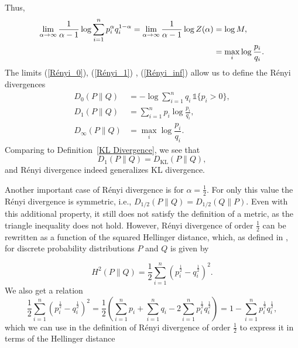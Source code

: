 Thus,
\begin{equation}
	\begin{aligned}
		\lim_{\alpha \rightarrow \infty} \frac{1}{\alpha-1} \log \sum_{i=1}^{n} p_i^\alpha q_i^{1-\alpha} = \lim_{\alpha \rightarrow \infty} \frac{1}{\alpha-1} \log Z(\alpha) &= \log M, \\
		&= \max_{i} \log \frac{p_i}{q_i}.
	\label{Rényi_inf}
	\end{aligned}
\end{equation}
The limits (\ref{Rényi_0}), (\ref{Rényi_1}) , (\ref{Rényi_inf}) allow us to define the Rényi divergences
\begin{equation*}
	\begin{aligned}
		D_0(P \| Q) &= - \log \sum_{i=1}^{n} q_i \, \mathds{1}\{p_i>0\}, \\
		D_1(P \| Q) &= \sum_{i=1}^{n} p_i \log \frac{p_i}{q_i}, \\
		D_\infty(P \| Q) &= \max_{i} \log{\dfrac{p_i}{q_i}}.
	\end{aligned}
\end{equation*}
Comparing to Definition~\ref{KL Divergence}, we see that
\begin{equation*}
	D_1(P \| Q) = D_{\text{KL}}(P \| Q),
\end{equation*}
and Rényi divergence indeed generalizes KL divergence.

Another important case of Rényi divergence is for $\alpha=\frac{1}{2}$. For only this value the Rényi divergence is symmetric, i.e., $D_{1/2}(P \| Q) = D_{1/2}(Q \| P)$. Even with this additional property, it still does not satisfy the definition of a metric, as the triangle inequality does not hold. However, Rényi divergence of order $\frac{1}{2}$ can be rewritten as a function of the squared Hellinger distance, which, as defined in \cite{Cheng2024}, for discrete probability distributions $P$ and $Q$ is given by

\begin{equation*}
	H^2(P\|Q) = \frac{1}{2} \sum_{i=1}^{n} (p_i^\frac{1}{2} - q_i^\frac{1}{2})^2.
\end{equation*}
We also get a relation
\begin{equation*}
	\frac{1}{2} \sum_{i=1}^{n} (p_i^\frac{1}{2} - q_i^\frac{1}{2})^2 = \frac{1}{2} \left( \sum_{i=1}^{n} p_i + \sum_{i=1}^{n} q_i - 2 \sum_{i=1}^{n} p_i^\frac{1}{2} q_i^\frac{1}{2} \right) = 1 - \sum_{i=1}^{n} p_i^\frac{1}{2} q_i^\frac{1}{2},
\end{equation*}
which we can use in the definition of Rényi divergence of order $\frac{1}{2}$ to express it in terms of the Hellinger distance

